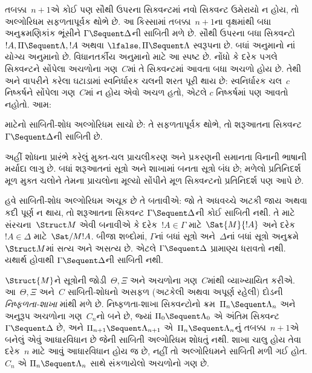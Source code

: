તબક્કા~$n+1$એ કોઈ પણ સૌથી ઉપરના સિક્વન્ટમાં નવો
સિક્વન્ટ ઉમેરાયો ન હોય, તો અલ્ગોરિધમ સફળતાપૂર્વક
થોભે છે. આ કિસ્સામાં તબક્કા~$n+1$ના વૃક્ષમાંથી
બધા અનુક્રમણિકાંક ભૂંસીને $\Gamma \Sequent \Delta$ની
સાબિતી મળે છે. સૌથી ઉપરના બધા સિક્વન્ટો
$!A, \Pi \Sequent \Lambda, !A$ અથવા
$\lfalse, \Pi \Sequent \Lambda$ સ્વરૂપના છે.
બધાં અનુમાનો નાં યોગ્ય અનુમાનો છે.
વિધાનતર્કીય અનુમાનો માટે આ સ્પષ્ટ છે.
નોંધો કે દરેક પગલે સિક્વન્ટને સોંપેલા
અચળોના ગણ~$C$માં તે સિક્વન્ટમાં આવતા
બધા અચળો હોય છે. તેથી
\LeftR{\lexists} અને \RightR{\lforall} વાપરીને
કરેલા ઘટાડામાં સ્વનિર્ધારક ચલની શરત પૂરી થાય છે:
સ્વનિર્ધારક ચલ~$c$ નિષ્કર્ષને સોંપેલા ગણ~$C$માં
ન હોય એવો અચળ હતો, એટલે $c$ નિષ્કર્ષમાં
પણ આવતો નહોતો. આમ:

\begin{prop}
 માટેનો સાબિતી-શોધ અલ્ગોરિધમ સાચો છે:
તે સફળતાપૂર્વક થોભે, તો શરૂઆતના
સિક્વન્ટ~$\Gamma \Sequent \Delta$ની સાબિતી છે.
\end{prop}
\endgroup

\begingroup
\makeatletter{}\makeatother


\label{guunit:OLP-0679}


અહીં શોધના પ્રારંભે કરેલું મુક્ત-ચલ પ્રાચલીકરણ
અને પ્રકરણની સમાનતા વિનાની ભાષાની મર્યાદા લાગુ છે.
બધાં શરૂઆતનાં સૂત્રો અને શાખામાં બનતા સૂત્રો બંધ છે;
મળેલો પ્રતિનિદર્શ મૂળ મુક્ત ચલોને તેમના પ્રાચલોના
મૂલ્યો સોંપીને મૂળ સિક્વન્ટનો પ્રતિનિદર્શ પણ આપે છે.


હવે સાબિતી-શોધ
અલ્ગોરિધમ અચૂક
છે તે બતાવીએ:
જો તે અધવચ્ચે
અટકી જાય અથવા
કદી પૂર્ણ ન
થાય, તો શરૂઆતના
સિક્વન્ટ
$\Gamma \Sequent \Delta$ની
કોઈ સાબિતી
નથી. તે માટે
સંરચના~$\Struct M$
એવી બનાવીએ કે
દરેક~$!A \in \Gamma$
માટે~$\Sat{M}{!A}$
અને દરેક
$!A \in \Delta$
માટે~$\Sat/{M}{!A}$.
બીજા શબ્દોમાં,
$\Gamma$નાં બધાં
સૂત્રો
અને~$\Delta$નાં
બધાં સૂત્રો
અનુક્રમે
$\Struct M$માં
સત્ય અને અસત્ય
છે. એટલે
$\Gamma \Sequent \Delta$
પ્રામાણ્ય ધરાવતો નથી.
 યથાર્થ
હોવાથી
$\Gamma \Sequent \Delta$ની
સાબિતી નથી.

$\Struct{M}$ને
સૂત્રોની
જોડી~$\Theta, \Xi$
અને
અચળોના
ગણ~$C$માંથી
વ્યાખ્યાયિત કરીએ.
આ~$\Theta, \Xi$
અને~$C$
સાબિતી-શોધનો
અસફળ (અટકેલી
અથવા અપૂર્ણ
રહેલી) દોડની
\emph{નિષ્ફળતા-શાખા}
માંથી મળે છે.
નિષ્ફળતા-શાખા
સિક્વન્ટોનો
ક્રમ~$\Pi_n \Sequent
\Lambda_n$
અને અનુરૂપ
અચળોના
ગણ~$C_n$નો
બને છે, જ્યાં
$\Pi_0 \Sequent \Lambda_0$
એ અંતિમ
સિક્વન્ટ
$\Gamma \Sequent
\Delta$ છે,
અને
$\Pi_{n+1} \Sequent \Lambda_{n+1}$
એ~$\Pi_n
\Sequent \Lambda_n$નું
તબક્કા~$n+1$એ
બનેલું એવું
આધારવિધાન છે
જેની સાબિતી
અલ્ગોરિધમ શોધતું
નથી. શાખા
ચાલુ હોય તેવા
દરેક~$n$
માટે આવું
આધારવિધાન હોય
જ છે, નહીં તો
અલ્ગોરિધમને
સાબિતી
મળી ગઈ હોત.
$C_n$ એ
$\Pi_n
\Sequent \Lambda_n$
સાથે સંકળાયેલો
અચળોનો
ગણ છે.



